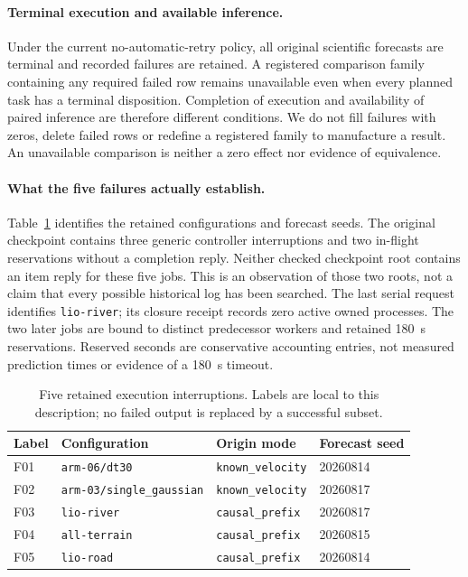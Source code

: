 \paragraph{Terminal execution and available inference.}
\label{sec:terminal-failures}\hypertarget{sec:terminal-failures}{}
Under the current no-automatic-retry policy, all original scientific
forecasts are terminal and recorded failures are retained. A registered comparison
family containing any required failed row remains unavailable even when
every planned task has a terminal disposition. Completion of execution and
availability of paired inference are therefore different conditions. We do
not fill failures with zeros, delete failed rows or redefine a registered
family to manufacture a result. An unavailable comparison is neither a zero
effect nor evidence of equivalence.

\paragraph{What the five failures actually establish.}
Table~\ref{tab:retained-failures} identifies the retained configurations and
forecast seeds. The original checkpoint contains three generic controller
interruptions and two in-flight reservations without a completion reply.
Neither checked checkpoint root contains an item reply for these five jobs.
This is an observation of those two roots, not a claim that every possible
historical log has been searched. The last serial request identifies
\texttt{lio-river}; its closure receipt records zero active owned processes.
The two later jobs are bound to distinct predecessor workers and retained
180~s reservations. Reserved seconds are conservative accounting entries,
not measured prediction times or evidence of a 180~s timeout.

\begin{table}[htbp]
\centering\small
\caption{Five retained execution interruptions. Labels are local to this
description; no failed output is replaced by a successful subset.}
\label{tab:retained-failures}\hypertarget{tab:retained-failures}{}
\begin{tabular}{llll}
\toprule
Label & Configuration & Origin mode & Forecast seed\\
\midrule
F01 & \texttt{arm-06/dt30} & \texttt{known\_velocity} & 20260814\\
F02 & \texttt{arm-03/single\_gaussian} & \texttt{known\_velocity} & 20260817\\
F03 & \texttt{lio-river} & \texttt{causal\_prefix} & 20260817\\
F04 & \texttt{all-terrain} & \texttt{causal\_prefix} & 20260815\\
F05 & \texttt{lio-road} & \texttt{causal\_prefix} & 20260814\\
\bottomrule
\end{tabular}
\end{table}

